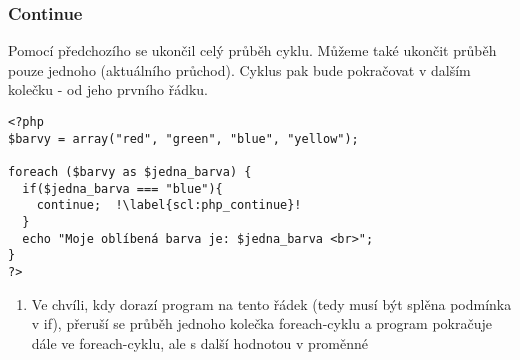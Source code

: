 \subsubsection{Continue}
Pomocí předchozího  se ukončil celý průběh cyklu. Můžeme také ukončit průběh pouze jednoho  (aktuálního průchod). Cyklus pak bude pokračovat v dalším kolečku - od jeho prvního řádku.\\
\begin{minipage}[t]{.45\textwidth}
\begin{code}
\begin{verbatim}
<?php
$barvy = array("red", "green", "blue", "yellow");

foreach ($barvy as $jedna_barva) {
  if($jedna_barva === "blue"){
    continue;  !\label{scl:php_continue}!
  }
  echo "Moje oblíbená barva je: $jedna_barva <br>";
}
?> 
\end{verbatim}

\label{code:php_continue}
\end{code}
\end{minipage}
\begin{minipage}[t]{.45\textwidth}
\begin{enumerate}
\vspace{3.2cm}
\item[ř. \ref{scl:php_break}:] Ve chvíli, kdy dorazí program na tento řádek (tedy musí být splěna podmínka v if), přeruší se průběh jednoho kolečka foreach-cyklu a program pokračuje dále ve foreach-cyklu, ale s další hodnotou v proměnné  
\end{enumerate}
\end{minipage}\\
 
 


